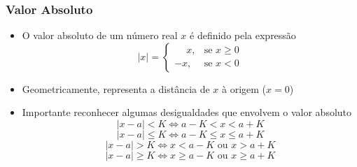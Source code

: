 \begin{frame}
  \frametitle{Valor Absoluto}
  \begin{itemize}
    \item O valor absoluto de um número real $x$ é definido pela expressão
    \begin{equation*}
      |x| = \begin{cases}
        \phantom{-}x, & \mbox{se } x \geq 0 \\
        -x, & \mbox{se } x < 0
      \end{cases}
    \end{equation*}
    \item Geometricamente, representa a distância de $x$ à origem ($x=0$)
    \item Importante reconhecer algumas desigualdades que envolvem o valor absoluto
    \begin{equation*}
      |x-a| < K \Leftrightarrow a-K<x<a+K
    \end{equation*}
    \begin{equation*}
      |x-a| \leq K \Leftrightarrow a-K\leq x\leq a+K
    \end{equation*}
    \begin{equation*}
      |x-a| > K \Leftrightarrow x < a-K \mbox{ ou } x > a + K
    \end{equation*}
    \begin{equation*}
      |x-a| \geq K \Leftrightarrow x \geq a-K \mbox{ ou } x \geq a + K
    \end{equation*}
  \end{itemize}
\end{frame}
